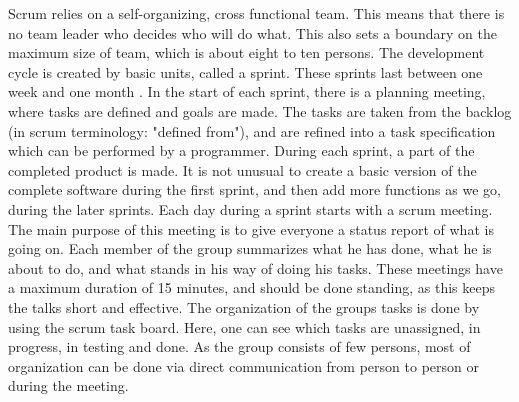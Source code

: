 Scrum relies on a self-organizing, cross functional team. This means that there is no team leader who decides who will do what. This also sets a boundary on the maximum size of team, which is about eight to ten persons.
\newline
\newline
The development cycle is created by basic units, called a sprint. These sprints last between one week and one month \cite{bib:scrum}. In the start of each sprint, there is a planning meeting, where tasks are defined and goals are made. The tasks are taken from the backlog (in scrum terminology: "defined from"), and are refined into a task specification which can be performed by a programmer. During each sprint, a part of the completed product is made. It is not unusual to create a basic version of the complete software during the first sprint, and then add more functions as we go, during the later sprints.
\newline
\newline
Each day during a sprint starts with a scrum meeting. The main purpose of this meeting is to give everyone a status report of what is going on. Each member of the group summarizes what he has done, what he is about to do, and what stands in his way of doing his tasks. These meetings have a maximum duration of 15 minutes, and should be done standing, as this keeps the talks short and effective.
\newline
\newline
The organization of the groups tasks is done by using the scrum task board. Here, one can see which tasks are unassigned, in progress, in testing and done. As the group consists of few persons, most of organization can be done via direct communication from person to person or during the meeting.


